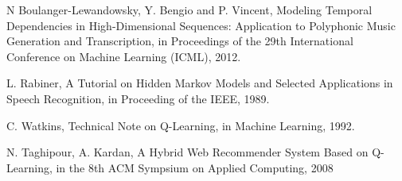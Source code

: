 \documentclass{article}
\begin{document}
\begin{thebibliography}{9}%

N Boulanger-Lewandowsky, Y. Bengio and P. Vincent, Modeling Temporal Dependencies in High-Dimensional Sequences: Application to Polyphonic Music Generation and Transcription, in Proceedings of the 29th International Conference on Machine Learning (ICML), 2012.

L. Rabiner, A Tutorial on Hidden Markov Models and Selected Applications in Speech Recognition, in Proceeding of the IEEE, 1989.

C. Watkins, Technical Note on Q-Learning, in Machine Learning, 1992.

N. Taghipour, A. Kardan, A Hybrid Web Recommender System Based on Q-Learning, in the 8th ACM Sympsium on Applied Computing, 2008

\end{thebibliography}
\end{document}
